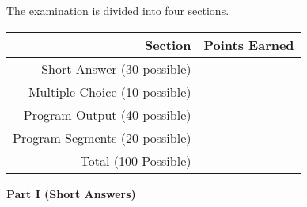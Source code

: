 \documentclass[12pt]{article}
\begin{document}
\begin{center}
  The examination is divided into four sections. \\
  \vspace*{.3in}

  \begin{tabular}{|r | l|} \hline
    {\bf Section} & {\bf Points Earned} \\ \hline 
    {Short Answer (30 possible)} & \hspace*{1.5in} \\ 
    {Multiple Choice (10 possible)} & \hspace*{1.5in} \\    
    {Program Output  (40 possible)} & \hspace*{1.5in} \\    
    {Program Segments (20 possible)} & \hspace*{1.5in} \\ \hline
    {Total (100 Possible)} & \hspace*{1.5in} \\ \hline
  \end{tabular}
\end{center}

\newpage

\noindent
{\bf Part I (Short Answers)}
\end{document}
